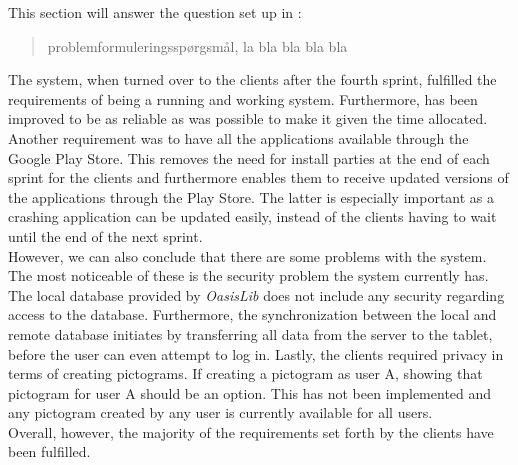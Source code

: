 This section will answer the question set up in :
\begin{quote}
problemformuleringsspørgsmål, la bla bla bla bla
\end{quote}

The system, when turned over to the clients after the fourth sprint, fulfilled the requirements of being a running and working system.
Furthermore, \launcher has been improved to be as reliable as was possible to make it given the time allocated.
Another requirement was to have all the \giraf applications available through the Google Play Store.
This removes the need for install parties at the end of each sprint for the clients and furthermore enables them to receive updated versions of the applications through the Play Store. 
The latter is especially important as a crashing application can be updated easily, instead of the clients having to wait until the end of the next sprint.\\

However, we can also conclude that there are some problems with the \giraf system.
The most noticeable of these is the security problem the \giraf system currently has.
The local database provided by \textit{OasisLib} does not include any security regarding access to the database.
Furthermore, the synchronization between the local and remote database initiates by transferring all data from the server to the tablet, before the user can even attempt to log in.
Lastly, the clients required privacy in terms of creating pictograms.
If creating a pictogram as user A, showing that pictogram for user A should be an option.
This has not been implemented and any pictogram created by any user is currently available for all users.\\

Overall, however, the majority of the requirements set forth by the clients have been fulfilled.